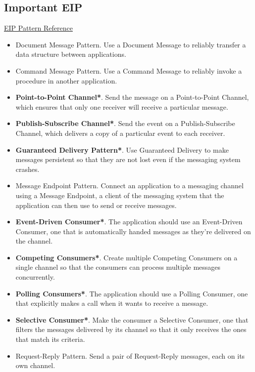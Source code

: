 \documentclass[../Main.tex]{subfiles}
\begin{document}
\subsection{Important EIP}
\href{https://www.enterpriseintegrationpatterns.com/ramblings/eip1_examples_updated.html}{EIP Pattern Reference}
\begin{multicols}{2}
    \begin{itemize}
        \item Document Message Pattern. Use a Document Message to reliably transfer a data structure between applications.
        \item Command Message Pattern. Use a Command Message to reliably invoke a procedure in another application.
        \item \textbf{Point-to-Point Channel*}. Send the message on a Point-to-Point Channel, which ensures that only one receiver will 
        receive a particular message.
        \item \textbf{Publish-Subscribe Channel*}.  Send the event on a Publish-Subscribe Channel, which delivers a copy of a particular event to each receiver.
        \item \textbf{Guaranteed Delivery Pattern*}. Use Guaranteed Delivery to make messages persistent so that they are not lost even if the 
        messaging system crashes.
        \item Message Endpoint Pattern. Connect an application to a messaging channel using a Message Endpoint, a client of the 
        messaging system that the application can then use to send or receive messages.
        \item \textbf{Event-Driven Consumer*}. The application should use an Event-Driven Consumer, one that is automatically handed messages 
        as they're delivered on the channel.
        \item \textbf{Competing Consumers*}. Create multiple Competing Consumers on a single channel so that the 
        consumers can process multiple messages concurrently.
        \item \textbf{Polling Consumers*}. The application should use a Polling Consumer, one that explicitly makes a call when it 
        wants to receive a message.
        \item \textbf{Selective Consumer*}. Make the consumer a Selective Consumer, one that filters the messages delivered by its 
        channel so that it only receives the ones that match its criteria.
        \item Request-Reply Pattern. Send a pair of Request-Reply messages, each on its own channel.

\end{itemize}
\end{multicols}
\end{document}
